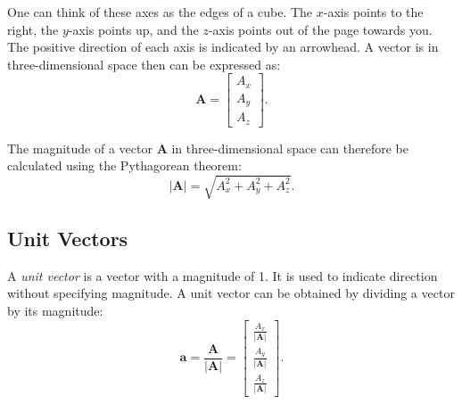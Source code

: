 \documentclass[../main.tex]{subfiles}
\begin{document}
One can think of these axes as the edges of a cube. The \(x\)-axis points to the right, the \(y\)-axis points up, and the \(z\)-axis points out of the page towards you. The positive direction of each axis is indicated by an arrowhead. A vector is in three-dimensional space then can be expressed as:
\[
\mathbf{A} = \begin{bmatrix} A_x \\ A_y \\ A_z \end{bmatrix}.
\]

\begin{center}
\end{center}

The magnitude of a vector \(\mathbf{A}\) in three-dimensional space can therefore be calculated using the Pythagorean theorem:
\[|\mathbf{A}| = \sqrt{A_x^2 + A_y^2 + A_z^2}.\]

\subsection{Unit Vectors}

A \emph{unit vector} is a vector with a magnitude of 1. It is used to indicate direction without specifying magnitude. A unit vector can be obtained by dividing a vector by its magnitude:
\[
\mathbf{a} = \frac{\mathbf{A}}{|\mathbf{A}|} = \begin{bmatrix} \frac{A_x}{|\mathbf{A}|} \\ \frac{A_y}{|\mathbf{A}|}  \\ \frac{A_z}{|\mathbf{A}|}  \end{bmatrix}.
\]
\end{document}
